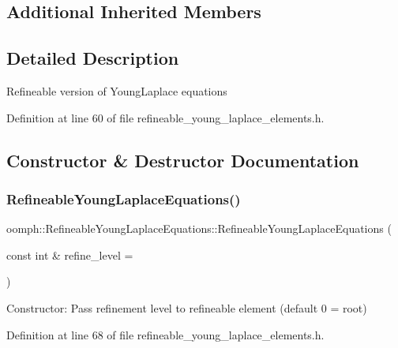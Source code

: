 \subsection*{Additional Inherited Members}


\subsection{Detailed Description}
Refineable version of Young\+Laplace equations 

Definition at line 60 of file refineable\+\_\+young\+\_\+laplace\+\_\+elements.\+h.



\subsection{Constructor \& Destructor Documentation}
\mbox{\label{classoomph_1_1RefineableYoungLaplaceEquations_a2a063bf86fb20b2db8cc962947663da2}} 
\subsubsection{\texorpdfstring{Refineable\+Young\+Laplace\+Equations()}{RefineableYoungLaplaceEquations()}\hspace{0.1cm}{\footnotesize\ttfamily [1/2]}}
{\footnotesize\ttfamily oomph\+::\+Refineable\+Young\+Laplace\+Equations\+::\+Refineable\+Young\+Laplace\+Equations (\begin{DoxyParamCaption}\item[{const int \&}]{refine\+\_\+level = {} }\end{DoxyParamCaption})\hspace{0.3cm}{\ttfamily [inline]}}



Constructor\+: Pass refinement level to refineable element (default 0 = root) 



Definition at line 68 of file refineable\+\_\+young\+\_\+laplace\+\_\+elements.\+h.

